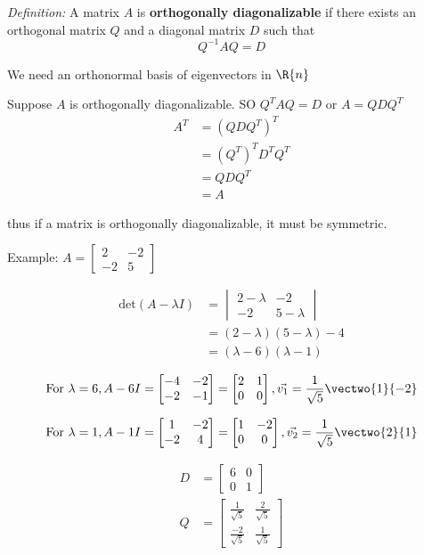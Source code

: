 \documentclass[12pt]{article}
\begin{document}
\textit{Definition:} A matrix $A$ is {\bf orthogonally diagonalizable} if there exists an orthogonal matrix $Q$ and a diagonal matrix $D$ such that \[ Q^{-1}AQ = D \]

We need an orthonormal basis of eigenvectors in $\R{n}$

Suppose $A$ is orthogonally diagonalizable. SO $Q^TAQ = D$ or $A = QDQ^T$
\begin{align*}
A^T &= (QDQ^T)^T\\
&= (Q^T)^TD^TQ^T\\
&= QDQ^T\\
&= A
\end{align*}

thus if a matrix is orthogonally diagonalizable, it must be symmetric.


Example: $A = \begin{bmatrix}2&-2\\-2&5\end{bmatrix}$

\begin{align*}
\text{det}(A-\lambda I) &= \begin{vmatrix}2-\lambda&-2\\-2&5-\lambda\end{vmatrix}\\
&= (2-\lambda)(5-\lambda) - 4\\
&= (\lambda - 6)(\lambda - 1)
\end{align*}

\[ \text{For } \lambda = 6, A-6I = \begin{bmatrix}-4&-2\\-2&-1\end{bmatrix} = \begin{bmatrix}2&1\\0&0\end{bmatrix}, \vec{v_1} = \frac{1}{\sqrt{5}}\vectwo{1}{-2} \]

\[ \text{For } \lambda = 1, A-1I = \begin{bmatrix}1&-2\\-2&4\end{bmatrix} = \begin{bmatrix}1&-2\\0&0\end{bmatrix}, \vec{v_2} = \frac{1}{\sqrt{5}}\vectwo{2}{1} \]

\begin{align*}
D &= \begin{bmatrix}6&0\\0&1\end{bmatrix}\\
Q &= \begin{bmatrix}\frac{1}{\sqrt{5}}&\frac{2}{\sqrt{5}}\\\frac{-2}{\sqrt{5}}&\frac{1}{\sqrt{5}}\end{bmatrix}
\end{align*}
\end{document}
